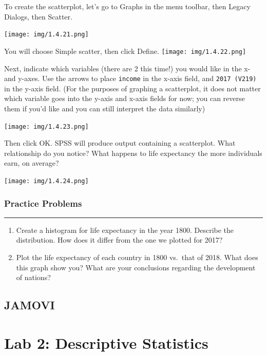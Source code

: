 \documentclass[]{book}
\begin{document}
To create the scatterplot, let's go to {Graphs} in the menu toolbar,
then {Legacy Dialogs}, then {Scatter}.

\texttt{[image: img/1.4.21.png]}

You will choose {Simple} scatter, then click {Define}.
\texttt{[image: img/1.4.22.png]}

Next, indicate which variables (there are 2 this time!) you would like
in the x- and y-axes. Use the arrows to place \texttt{income} in the
x-axis field, and \texttt{2017\ (V219)} in the y-axis field. (For the
purposes of graphing a scatterplot, it does not matter which variable
goes into the y-axis and x-axis fields for now; you can reverse them if
you'd like and you can still interpret the data similarly)

\texttt{[image: img/1.4.23.png]}

Then click {OK}. SPSS will produce output containing a scatterplot. What
relationship do you notice? What happens to life expectancy the more
individuals earn, on average?

\texttt{[image: img/1.4.24.png]}

\subsection{Practice Problems}\label{practice-problems}

\begin{center}\rule{0.5\linewidth}{0.5pt}\end{center}

\begin{enumerate}
\def\labelenumi{\arabic{enumi}.}
\item
  Create a histogram for life expectancy in the year 1800. Describe the
  distribution. How does it differ from the one we plotted for 2017?
\item
  Plot the life expectancy of each country in 1800 vs.~that of 2018.
  What does this graph show you? What are your conclusions regarding the
  development of nations?
\end{enumerate}

\section{JAMOVI}\label{jamovi-1}

\chapter{Lab 2: Descriptive
Statistics}\label{lab-2-descriptive-statistics}
\end{document}

